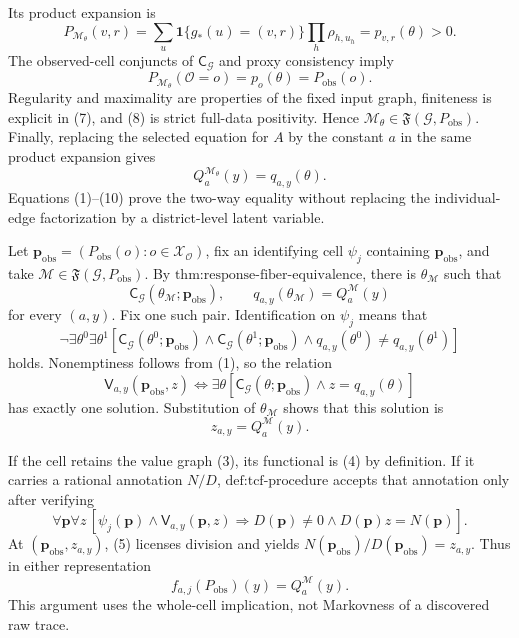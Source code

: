Its product expansion is
\[
P_{\mathcal M_\theta}(v,r)
=\sum_u\mathbf 1\{g_*(u)=(v,r)\}\prod_h\rho_{h,u_h}
=p_{v,r}(\theta)>0.
\tag{8}
\]
The observed-cell conjuncts of \(\mathsf C_{\mathcal G}\) and proxy consistency imply
\[
P_{\mathcal M_\theta}(\mathcal O=o)
=p_o(\theta)=P_{\mathrm{obs}}(o).
\tag{9}
\]
Regularity and maximality are properties of the fixed input graph, finiteness is explicit in (7), and (8) is strict full-data positivity. Hence \(\mathcal M_\theta\in\mathfrak F(\mathcal G,P_{\mathrm{obs}})\). Finally, replacing the selected equation for \(A\) by the constant \(a\) in the same product expansion gives
\[
Q_a^{\mathcal M_\theta}(y)=q_{a,y}(\theta).
\tag{10}
\]
Equations (1)--(10) prove the two-way equality without replacing the individual-edge factorization by a district-level latent variable.

Let \(\mathbf p_{\mathrm{obs}}=(P_{\mathrm{obs}}(o):o\in\mathcal X_{\mathcal O})\), fix an identifying cell \(\psi_j\) containing \(\mathbf p_{\mathrm{obs}}\), and take \(\mathcal M\in\mathfrak F(\mathcal G,P_{\mathrm{obs}})\). By \(\text{thm:response-fiber-equivalence}\), there is \(\theta_{\mathcal M}\) such that
\[
\mathsf C_{\mathcal G}(\theta_{\mathcal M};\mathbf p_{\mathrm{obs}}),
\qquad
q_{a,y}(\theta_{\mathcal M})=Q_a^{\mathcal M}(y)
\tag{1}
\]
for every \((a,y)\). Fix one such pair. Identification on \(\psi_j\) means that
\[
\neg\exists\theta^0\exists\theta^1
\left[
\mathsf C_{\mathcal G}(\theta^0;\mathbf p_{\mathrm{obs}})
\wedge\mathsf C_{\mathcal G}(\theta^1;\mathbf p_{\mathrm{obs}})
\wedge q_{a,y}(\theta^0)\ne q_{a,y}(\theta^1)
\right]
\tag{2}
\]
holds. Nonemptiness follows from (1), so the relation
\[
\mathsf V_{a,y}(\mathbf p_{\mathrm{obs}},z)
\Longleftrightarrow
\exists\theta\left[
\mathsf C_{\mathcal G}(\theta;\mathbf p_{\mathrm{obs}})
\wedge z=q_{a,y}(\theta)
\right]
\tag{3}
\]
has exactly one solution. Substitution of \(\theta_{\mathcal M}\) shows that this solution is
\[
z_{a,y}=Q_a^{\mathcal M}(y).
\tag{4}
\]

If the cell retains the value graph (3), its functional is (4) by definition. If it carries a rational annotation \(N/D\), \(\text{def:tcf-procedure}\) accepts that annotation only after verifying
\[
\forall\mathbf p\forall z\,
\left[
\psi_j(\mathbf p)\wedge\mathsf V_{a,y}(\mathbf p,z)
\Longrightarrow D(\mathbf p)\ne0\wedge D(\mathbf p)z=N(\mathbf p)
\right].
\tag{5}
\]
At \((\mathbf p_{\mathrm{obs}},z_{a,y})\), (5) licenses division and yields \(N(\mathbf p_{\mathrm{obs}})/D(\mathbf p_{\mathrm{obs}})=z_{a,y}\). Thus in either representation
\[
f_{a,j}(P_{\mathrm{obs}})(y)=Q_a^{\mathcal M}(y).
\tag{6}
\]
This argument uses the whole-cell implication, not Markovness of a discovered raw trace.

